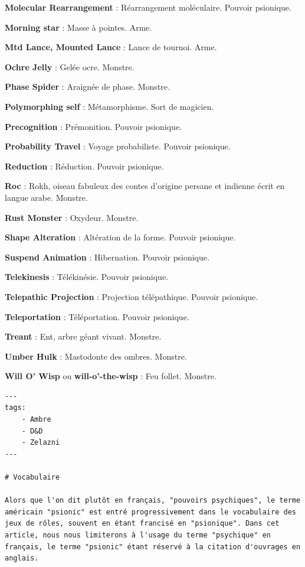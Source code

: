 \documentclass[11pt]{article}
\begin{document}
{{\textbf{Molecular Rearrangement} : Réarrangement moléculaire. Pouvoir psionique.

\textbf{Morning star} : Masse à pointes. Arme.

\textbf{Mtd Lance, Mounted Lance} : Lance de tournoi. Arme.

\textbf{Ochre Jelly} : Gelée ocre. Monstre.

\textbf{Phase Spider} : Araignée de phase. Monstre.

\textbf{Polymorphing self} : Métamorphisme. Sort de magicien.

\textbf{Precognition} : Prémonition. Pouvoir psionique.

\textbf{Probability Travel} : Voyage probabiliste. Pouvoir psionique.

\textbf{Reduction} : Réduction. Pouvoir psionique.

\textbf{Roc} : Rokh, oiseau fabuleux des contes d'origine persane et indienne écrit en langue arabe. Monstre.

\textbf{Rust Monster} : Oxydeur. Monstre.

\textbf{Shape Alteration} : Altération de la forme. Pouvoir psionique.

\textbf{Suspend Animation} : Hibernation. Pouvoir psionique.

\textbf{Telekinesis} : Télékinésie. Pouvoir psionique.

\textbf{Telepathic Projection} : Projection télépathique. Pouvoir psionique.

\textbf{Teleportation} : Téléportation. Pouvoir psionique.

\textbf{Treant} : Ent, arbre géant vivant. Monstre.

\textbf{Umber Hulk} : Mastodonte des ombres. Monstre.

\textbf{Will O’ Wisp} ou \textbf{will-o'-the-wisp} : Feu follet. Monstre.

}%













\begin{verbatim}
---
tags:
    - Ambre
    - D&D
    - Zelazni
---

# Vocabulaire

Alors que l'on dit plutôt en français, "pouvoirs psychiques", le terme américain "psionic" est entré progressivement dans le vocabulaire des jeux de rôles, souvent en étant francisé en "psionique". Dans cet article, nous nous limiterons à l'usage du terme "psychique" en français, le terme "psionic" étant réservé à la citation d'ouvrages en anglais.


\end{verbatim}}
\end{document}
